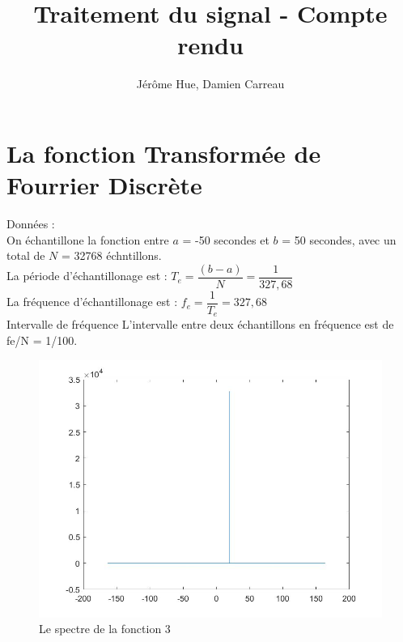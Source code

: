 \documentclass[10pt,a4paper]{article}
\author{Jérôme Hue, Damien Carreau}
\title{Traitement du signal - Compte rendu}
\begin{document}
\maketitle
\section{La fonction Transformée de Fourrier Discrète}
\noindent
Données : \\
On échantillone la fonction entre $a$  = -50 secondes et $b$ = 50 secondes, avec un total de $N$ = 32768 échntillons.\\
La période d'échantillonage est : \( T_e = \dfrac{(b-a)}{N} = \dfrac{1}{327,68} \) \\
La fréquence d'échantillonage est : \( f_e = \dfrac{1}{T_e} = 327,68 \) \\
Intervalle de fréquence
L'intervalle entre deux échantillons en fréquence est de fe/N = 1/100.


\begin{figure}[h]
\begin{center}
\includegraphics[scale=0.35]{tf_fct3.jpg}
\caption{Le spectre de la fonction 3}
\end{center}
\end{figure}
\end{document}
